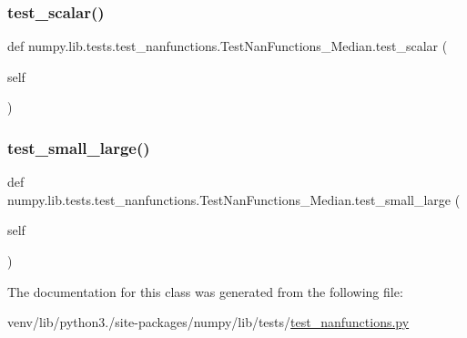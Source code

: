 \subsubsection{\texorpdfstring{test\+\_\+scalar()}{test\_scalar()}}
{\footnotesize\ttfamily def numpy.\+lib.\+tests.\+test\+\_\+nanfunctions.\+Test\+Nan\+Functions\+\_\+\+Median.\+test\+\_\+scalar (\begin{DoxyParamCaption}\item[{}]{self }\end{DoxyParamCaption})}

\mbox{\label{classnumpy_1_1lib_1_1tests_1_1test__nanfunctions_1_1TestNanFunctions__Median_ada8f2590971bfac507b470dde89f13da}} 
\subsubsection{\texorpdfstring{test\+\_\+small\+\_\+large()}{test\_small\_large()}}
{\footnotesize\ttfamily def numpy.\+lib.\+tests.\+test\+\_\+nanfunctions.\+Test\+Nan\+Functions\+\_\+\+Median.\+test\+\_\+small\+\_\+large (\begin{DoxyParamCaption}\item[{}]{self }\end{DoxyParamCaption})}



The documentation for this class was generated from the following file\+:\begin{DoxyCompactItemize}
\item 
venv/lib/python3./site-\/packages/numpy/lib/tests/\hyperlink{test__nanfunctions_8py}{test\+\_\+nanfunctions.\+py}\end{DoxyCompactItemize}
